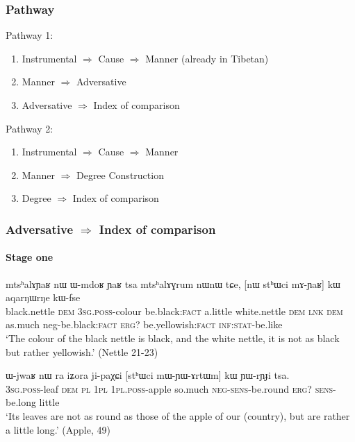 \documentclass[xcolor=table]{beamer}
\newcommand{\ipa}[1]{{\phon \mbox{#1}}} %
\begin{document}
  \begin{frame} 
 \frametitle{Pathway} 
 Pathway 1:
\begin{enumerate}
\item Instrumental $\Rightarrow$ Cause $\Rightarrow$ Manner (already in Tibetan)
\item Manner  $\Rightarrow$ Adversative
\item Adversative $\Rightarrow$ Index of comparison
\end{enumerate}

Pathway 2:
\begin{enumerate}
\item Instrumental $\Rightarrow$ Cause $\Rightarrow$ Manner 
\item Manner  $\Rightarrow$ Degree Construction
\item Degree $\Rightarrow$ Index of comparison
\end{enumerate}
\end{frame}     

  \begin{frame} 
 \frametitle{Adversative $\Rightarrow$ Index of comparison}
  \framesubtitle{Stage one}
\begin{exe}
  \ex  \label{ex:mAYaR.kW}  
  \gll 
  \ipa{mtsʰalɤɲaʁ} 	\ipa{nɯ} 	\ipa{ɯ-mdoʁ} 	\ipa{ɲaʁ} 	\ipa{tsa} 	\ipa{mtsʰalɤɣrum} 	\ipa{nɯnɯ} 	\ipa{tɕe,} 	[\ipa{nɯ} \ipa{stʰɯci} 	\ipa{mɤ-ɲaʁ}] 	\ipa{kɯ}   	\ipa{aqarŋɯrŋe} 	\ipa{kɯ-fse} 	\\
  black.nettle \textsc{dem} \textsc{3sg.poss}-colour be.black:\textsc{fact} a.little   white.nettle \textsc{dem} \textsc{lnk} \textsc{dem} as.much neg-be.black:\textsc{fact}  \textsc{erg?} be.yellowish:\textsc{fact} \textsc{inf:stat}-be.like \\
  \glt `The colour of the black nettle is black, and the white nettle, it is not as  black but rather yellowish.'   (Nettle 21-23)
        \end{exe} 
        
\begin{exe}
  \ex  \label{ex:mWYArtWm.kW}  
  \gll      
\ipa{ɯ-jwaʁ} 	\ipa{nɯ} \ipa{ra} 	\ipa{iʑora} 	\ipa{ji-paχɕi} 	[\ipa{stʰɯci} 	\ipa{mɯ-ɲɯ-ɤrtɯm}] 	\ipa{kɯ} 	\ipa{ɲɯ-rɲɟi} 	\ipa{tsa.} \\
\textsc{3sg.poss}-leaf \textsc{dem} \textsc{pl} \textsc{1pl} \textsc{1pl.poss}-apple so.much \textsc{neg-sens}-be.round \textsc{erg?} \textsc{sens}-be.long little \\
\glt `Its leaves  are not as round as those of the apple of our (country), but are rather a little long.'
(Apple, 49)
\end{exe} 

\end{frame}     
\end{document}
